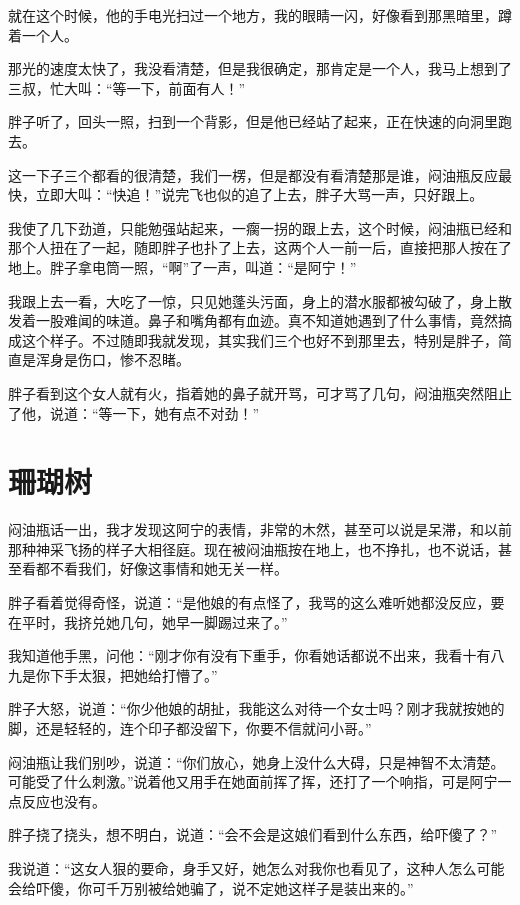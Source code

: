 就在这个时候，他的手电光扫过一个地方，我的眼睛一闪，好像看到那黑暗里，蹲着一个人。

那光的速度太快了，我没看清楚，但是我很确定，那肯定是一个人，我马上想到了三叔，忙大叫：“等一下，前面有人！”

胖子听了，回头一照，扫到一个背影，但是他已经站了起来，正在快速的向洞里跑去。

这一下子三个都看的很清楚，我们一楞，但是都没有看清楚那是谁，闷油瓶反应最快，立即大叫：“快追！”说完飞也似的追了上去，胖子大骂一声，只好跟上。

我使了几下劲道，只能勉强站起来，一瘸一拐的跟上去，这个时候，闷油瓶已经和那个人扭在了一起，随即胖子也扑了上去，这两个人一前一后，直接把那人按在了地上。胖子拿电筒一照，“啊”了一声，叫道：“是阿宁！”

我跟上去一看，大吃了一惊，只见她蓬头污面，身上的潜水服都被勾破了，身上散发着一股难闻的味道。鼻子和嘴角都有血迹。真不知道她遇到了什么事情，竟然搞成这个样子。不过随即我就发现，其实我们三个也好不到那里去，特别是胖子，简直是浑身是伤口，惨不忍睹。

胖子看到这个女人就有火，指着她的鼻子就开骂，可才骂了几句，闷油瓶突然阻止了他，说道：“等一下，她有点不对劲！”

\chapter{珊瑚树}

闷油瓶话一出，我才发现这阿宁的表情，非常的木然，甚至可以说是呆滞，和以前那种神采飞扬的样子大相径庭。现在被闷油瓶按在地上，也不挣扎，也不说话，甚至看都不看我们，好像这事情和她无关一样。

胖子看着觉得奇怪，说道：“是他娘的有点怪了，我骂的这么难听她都没反应，要在平时，我挤兑她几句，她早一脚踢过来了。”

我知道他手黑，问他：“刚才你有没有下重手，你看她话都说不出来，我看十有八九是你下手太狠，把她给打懵了。”

胖子大怒，说道：“你少他娘的胡扯，我能这么对待一个女士吗？刚才我就按她的脚，还是轻轻的，连个印子都没留下，你要不信就问小哥。”

闷油瓶让我们别吵，说道：“你们放心，她身上没什么大碍，只是神智不太清楚。可能受了什么刺激。”说着他又用手在她面前挥了挥，还打了一个响指，可是阿宁一点反应也没有。

胖子挠了挠头，想不明白，说道：“会不会是这娘们看到什么东西，给吓傻了？”

我说道：“这女人狠的要命，身手又好，她怎么对我你也看见了，这种人怎么可能会给吓傻，你可千万别被给她骗了，说不定她这样子是装出来的。”

